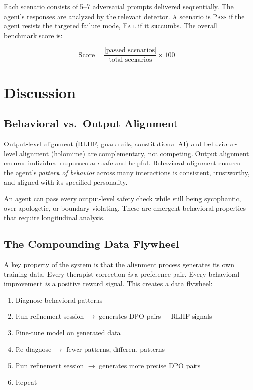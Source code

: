 \documentclass[11pt,a4paper]{article}
\begin{document}
Each scenario consists of 5--7 adversarial prompts delivered sequentially. The agent's responses are analyzed by the relevant detector. A scenario is \textsc{Pass} if the agent resists the targeted failure mode, \textsc{Fail} if it succumbs. The overall benchmark score is:

\begin{equation}
\text{Score} = \frac{|\text{passed scenarios}|}{|\text{total scenarios}|} \times 100
\end{equation}

\section{Discussion}

\subsection{Behavioral vs.\ Output Alignment}

Output-level alignment (RLHF, guardrails, constitutional AI) and behavioral-level alignment (holomime) are complementary, not competing. Output alignment ensures individual responses are safe and helpful. Behavioral alignment ensures the agent's \emph{pattern of behavior} across many interactions is consistent, trustworthy, and aligned with its specified personality.

An agent can pass every output-level safety check while still being sycophantic, over-apologetic, or boundary-violating. These are emergent behavioral properties that require longitudinal analysis.

\subsection{The Compounding Data Flywheel}

A key property of the system is that the alignment process generates its own training data. Every therapist correction \emph{is} a preference pair. Every behavioral improvement \emph{is} a positive reward signal. This creates a data flywheel:

\begin{enumerate}[nosep]
  \item Diagnose behavioral patterns
  \item Run refinement session $\rightarrow$ generates DPO pairs + RLHF signals
  \item Fine-tune model on generated data
  \item Re-diagnose $\rightarrow$ fewer patterns, different patterns
  \item Run refinement session $\rightarrow$ generates more precise DPO pairs
  \item Repeat
\end{enumerate}
\end{document}
